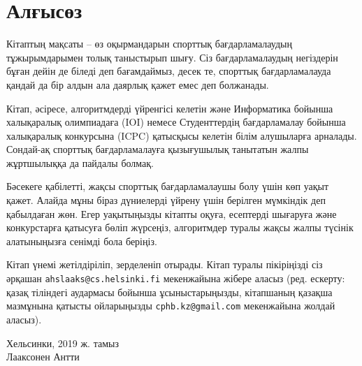 \chapter*{Алғысөз}

Кітаптың мақсаты -- өз оқырмандарын спорттық бағдарламалаудың тұжырымдарымен толық таныстырып шығу. Сіз бағдарламалаудың негіздерін  бұған дейін де біледі деп бағамдаймыз, десек те, спорттық бағдарламалауда қандай да бір алдын ала даярлық қажет емес деп болжанады.

Кітап, әсіресе, алгоритмдерді үйренгісі келетін және Информатика бойынша халықаралық олимпиадаға (IOI) немесе  Студенттердің бағдарламалау бойынша халықаралық конкурсына (ICPC) қатысқысы келетін білім алушыларға арналады. Сондай-ақ спорттық бағдарламалауға қызығушылық танытатын жалпы жұртшылыққа да пайдалы болмақ.



Бәсекеге қабілетті, жақсы спорттық бағдарламалаушы болу үшін көп уақыт қажет. Алайда мұны біраз дүниелерді үйрену үшін берілген мүмкіндік деп қабылдаған жөн. Егер уақытыңызды кітапты оқуға, есептерді шығаруға және конкурстарға қатысуға бөліп жүрсеңіз, алгоритмдер туралы жақсы жалпы түсінік алатыныңызға сенімді бола беріңіз.


Кітап үнемі жетілдіріліп, зерделеніп отырады. Кітап туралы пікіріңізді сіз әрқашан \texttt{ahslaaks@cs.helsinki.fi} мекенжайына жібере аласыз (ред. ескерту: қазақ тіліндегі аудармасы бойынша ұсыныстарыңызды, кітапшаның қазақша мазмұнына қатысты ойларыңызды \texttt{cphb.kz@gmail.com} мекенжайына жолдай аласыз).


\begin{flushright}
Хельсинки, 2019 ж. тамыз \\
Лааксонен Антти
\end{flushright}



